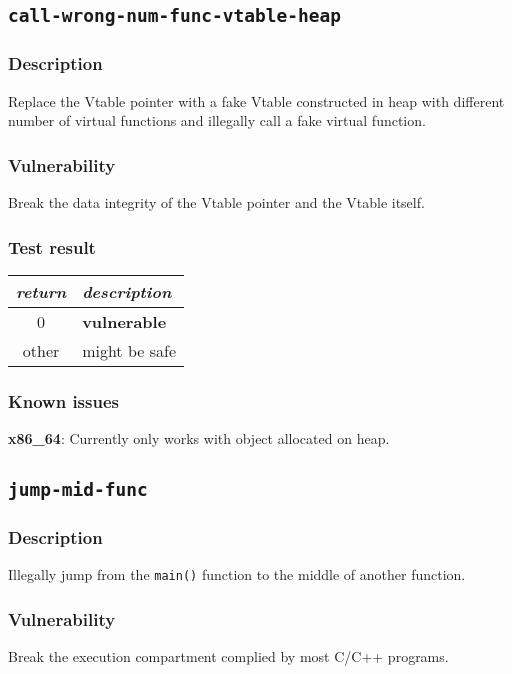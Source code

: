 \documentclass[a4paper]{book}
\begin{document}
\newpage
\subsection{\texttt{call-wrong-num-func-vtable-heap}}\label{test-call-wrong-num-func-vtable-heap}

\subsubsection{Description}
Replace the Vtable pointer with a fake Vtable constructed in heap with different number of virtual functions and
illegally call a fake virtual function.

\subsubsection{Vulnerability}
Break the data integrity of the Vtable pointer and the Vtable itself.

\subsubsection{Test result}
\begin{tabular}{cl}
  \toprule
  \emph{return}  & \emph{description} \\
  \midrule
  0              & \textbf{vulnerable} \\
  other          & might be safe \\
  \bottomrule
\end{tabular}

\subsubsection{Known issues}

\textbf{x86\_64}: Currently only works with object allocated on heap.

\newpage
\subsection{\texttt{jump-mid-func}}\label{test-jump-mid-func}

\subsubsection{Description}
Illegally jump from the \texttt{main()} function to the middle of another function.

\subsubsection{Vulnerability}
Break the execution compartment complied by most C/C++ programs.
\end{document}
